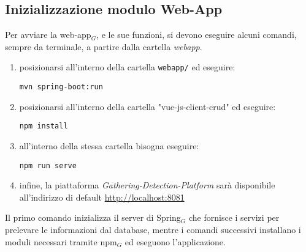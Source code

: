 \subsection{Inizializzazione modulo Web-App}\label{RequisitiDiSistemaEdInstallazioneInstallazioneInizializzazioneModuloWebApp}
Per avviare la web-app$_G$, e le sue funzioni, si devono eseguire alcuni comandi, sempre da terminale, a partire dalla cartella \textit{webapp}.
\begin{enumerate}
	\item posizionarsi all'interno della cartella \texttt{webapp/} ed eseguire:
\begin{lstlisting}
mvn spring-boot:run
\end{lstlisting}
\item posizionarsi all'interno della cartella "vue-js-client-crud" ed eseguire:
\begin{lstlisting}
npm install
\end{lstlisting}
\item all'interno della stessa cartella bisogna eseguire:
\begin{lstlisting}
npm run serve
\end{lstlisting}
\item infine, la piattaforma \textit{Gathering-Detection-Platform} sarà disponibile all'indirizzo di default \url{http://localhost:8081} 
\end{enumerate}
Il primo comando inizializza il server di Spring$_G$ che fornisce i servizi per prelevare le informazioni dal database, mentre i comandi successivi installano i moduli necessari tramite npm$_G$ ed eseguono l'applicazione.

